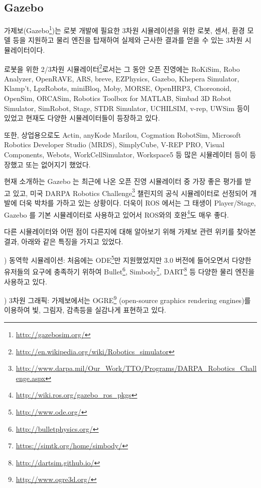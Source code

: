 \subsection{Gazebo}

가제보(Gazebo\footnote{\url{http://gazebosim.org/}})는 로봇 개발에 필요한 3차원 시뮬레이션을 위한 로봇, 센서, 환경 모델 등을 지원하고 물리 엔진을 탑재하여 실제와 근사한 결과를 얻을 수 있는 3차원 시뮬레이터이다. 

로봇을 위한 2/3차원 시뮬레이터\footnote{\url{http://en.wikipedia.org/wiki/Robotics_simulator}}로서는 그 동안 오픈 진영에는  RoKiSim, Robo Analyzer, OpenRAVE, ARS, breve, EZPhysics, Gazebo, Khepera Simulator, Klamp't, LpzRobots, miniBloq, Moby, MORSE, OpenHRP3, Choreonoid, OpenSim, ORCASim, Robotics Toolbox for MATLAB, Simbad 3D Robot Simulator, SimRobot, Stage, STDR Simulator, UCHILSIM, v-rep, UWSim 등이 있었고 현재도 다양한 시뮬레이터들이 등장하고 있다.

또한, 상업용으로도 Actin, anyKode Marilou, Cogmation RobotSim, Microsoft Robotics Developer Studio (MRDS), SimplyCube, V-REP PRO, Visual Components, Webots, WorkCellSimulator, Workspace5 등 많은 시뮬레이터 등이 등장했고 또는 없어지기 했었다. 

현재 소개하는 Gazebo 는 최근에 나온 오픈 진영 시뮬레이터 중 가장 좋은 평가를 받고 있고, 미국 DARPA Robotics Challenge\footnote{\url{http://www.darpa.mil/Our_Work/TTO/Programs/DARPA_Robotics_Challenge.aspx}} 챌린지의 공식 시뮬레이터로 선정되어 개발에 더욱 박차를 가하고 있는 상황이다. 더욱이 ROS 에서는 그 태생이 Player/Stage, Gazebo 를 기본 시뮬레이터로 사용하고 있어서 ROS와의 호완\footnote{\url{http://wiki.ros.org/gazebo_ros_pkgs}}도 매우 좋다.

다른 시뮬레이터와 어떤 점이 다른지에 대해 알아보기 위해 가제보 관련 위키를 찾아본 결과, 아래와 같은 특징을 가지고 있었다.

\setcounter{num}{0}

\vspace{\baselineskip}
\noindent{}
\thenum) 동역학 시뮬레이션: 처음에는 ODE\footnote{\url{http://www.ode.org/}}만 지원했었지만 3.0 버전에 들어오면서 다양한 유저들의 요구에 충족하기 위하여 Bullet\footnote{\url{http://bulletphysics.org/}}, Simbody\footnote{\url{https://simtk.org/home/simbody/}}, DART\footnote{\url{http://dartsim.github.io/}} 등 다양한 물리 엔진을 사용하고 있다.

\vspace{\baselineskip}
\noindent{}
\thenum) 3차원 그래픽: 가제보에서는 OGRE\footnote{\url{http://www.ogre3d.org/}} (open-source graphics rendering engines)를 이용하여 빛, 그림자, 감촉등을 실감나게 표현하고 있다.

